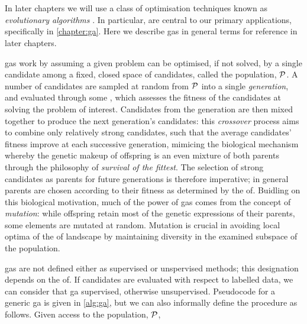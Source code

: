 \section{}\label{sec:genetic_algorithms}
In later chapters we will use a class of optimisation techniques known as \emph{evolutionary algorithms} \cite{back1996evolutionary, de2020evolutionary}.
In particular, \emph{} are central to our primary applications, 
    specifically in \cref{chapter:ga}.
Here we describe \glspl{ga} in general terms for reference in later chapters. 
\par 
\glspl{ga} work by assuming a given problem can be optimised, if not solved, by a single candidate 
    among a fixed, closed space of candidates, called the population, $\mathcal{P}$. 
A number of candidates are sampled at random from $\mathcal{P}$ into a single \emph{generation}, 
    and evaluated through some , which assesses the fitness of the candidates at solving the problem of interest. 
Candidates from the generation are then mixed together to produce the next generation's candidates: 
    this \emph{crossover} process aims to combine only relatively strong candidates, such that the average 
    candidates' fitness improve at each successive generation, 
    mimicing the biological mechanism whereby the genetic makeup of offspring is an even mixture of both parents
    through the philosophy of \emph{survival of the fittest}. 
The selection of strong candidates as parents for future generations is therefore imperative; 
    in general parents are chosen according to their fitness as determined by the \gls{of}. 
Buidling on this biological motivation, much of the power of \glspl{ga} comes from the concept of \emph{mutation}: 
    while offspring retain most of the genetic expressions of their parents, some elements are mutated at random.
Mutation is crucial in avoiding local optima of the \gls{of} landscape
    by maintaining diversity in the examined subspace of the population.
\par 

\glspl{ga} are not defined either as supervised or unspervised methods;
    this designation depends on the \gls{of}. 
If candidates are evaluated with respect to labelled data, we can consider that \gls{ga} supervised, 
    otherwise unsupervised. 
Pseudocode for a generic \gls{ga} is given in \cref{alg:ga},
    but we can also informally define the procedure as follows. 
Given access to the population, $\mathcal{P}$, 

